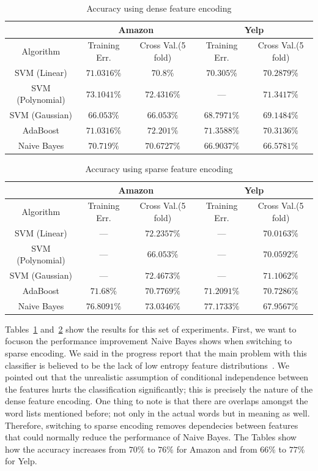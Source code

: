\documentclass[letterpaper]{article}
\begin{document}
\begin{table}[ht]
\centering
\begin{tabular}{c | c c | c c}
 & \multicolumn{2}{|c|}{Amazon} & \multicolumn{2}{|c}{Yelp} \\
\hline
Algorithm & Training Err. & Cross Val.(5 fold) & Training Err. & Cross Val.(5 fold)\\
\hline
SVM (Linear) 		& $71.0316\%$ & $70.8\%$ & $70.305\%$ & $70.2879\%$\\
SVM (Polynomial) 	& $73.1041\%$ & $72.4316\%$ & --- & $71.3417\%$\\
SVM (Gaussian) 		& $66.053\%$ & $66.053\%$ & $68.7971\%$ & $69.1484\%$\\
AdaBoost 			& $71.0316\%$ & $72.201\%$ & $71.3588\%$ & $70.3136\%$\\ 
Naive Bayes 		& $70.719\%$ & $70.6727\%$ & $66.9037\%$ & $66.5781\%$\\ 
\end{tabular}
\caption{Accuracy using dense feature encoding}
\label{tab:dense}
\end{table}


\begin{table}[ht]
\centering
\begin{tabular}{c | c c | c c}
 & \multicolumn{2}{|c|}{Amazon} & \multicolumn{2}{|c}{Yelp} \\
\hline
Algorithm & Training Err. & Cross Val.(5 fold) & Training Err. & Cross Val.(5 fold)\\
\hline
SVM (Linear) 		& --- & $72.2357\%$ 		& --- & $70.0163\%$\\
SVM (Polynomial) 	& --- & $66.053\%$ 		& --- & $70.0592\%$\\
SVM (Gaussian) 		& --- & $72.4673\%$ 		& --- & $71.1062\%$\\
AdaBoost 			& $71.68\%$   & $70.7769\%$ & $71.2091\%$ & $70.7286\%$\\ 
Naive Bayes 		& $76.8091\%$ & $73.0346\%$ & $77.1733\%$ & $67.9567\%$\\ 
\end{tabular}
\caption{Accuracy using sparse feature encoding}
\label{tab:sparse}
\end{table}

Tables~\ref{tab:dense} and~\ref{tab:sparse} show the results for this
set of experiments. First, we want to focuson the performance
improvement Naive Bayes shows when switching to sparse encoding. We
said in the progress report that the main problem with this classifier
is believed to be the lack of low entropy feature
distributions~\cite{naivebayes}. We pointed out that the unrealistic
assumption of conditional independence between the features hurts the
classification significantly; this is precisely the nature of the
dense feature encoding. One thing to note is that there are overlaps
amongst the word lists mentioned before; not only in the actual words
but in meaning as well. Therefore, switching to sparse encoding
removes dependecies between features that could normally reduce the
performance of Naive Bayes. The Tables show how the accuracy increases
from $70\%$ to $76\%$ for Amazon and from $66\%$ to $77\%$ for Yelp.
\end{document}
